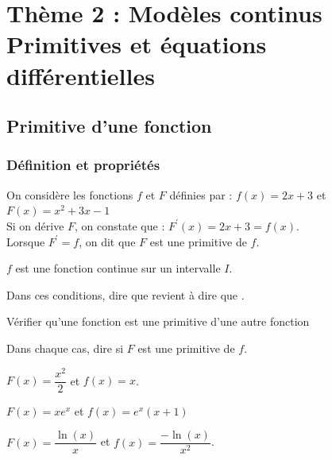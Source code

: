 \chapter[Thème 2 $-$ Primitives et équa diff]{Thème 2 : Modèles continus \\Primitives et équations différentielles}
\thispagestyle{fancy}

\vspace*{-0.6cm}
\section{Primitive d'une fonction}
\subsection{Définition et propriétés}

\begin{bexemple}
	On considère les fonctions $f$ et $F$ définies par : $f(x)=2 x+3$ et $F(x)=x^{2}+3 x-1$\\
	Si on dérive $F$, on constate que : $F^{\prime}(x)=2 x+3=f(x)$.\\
	Lorsque $F^{\prime}=f$, on dit que $F$ est une primitive de $f$.
\end{bexemple}

\begin{bdefi}
	$f$ est une fonction continue sur un intervalle $I$.\\
	\pointilles[\textwidth-0.5cm]
\end{bdefi}	

\begin{brmq}
	Dans ces conditions, dire que  revient à dire que  .
\end{brmq}

\begin{bmethodet}{Vérifier qu'une fonction est une primitive d'une autre fonction}
	
	Dans chaque cas, dire si $F$ est une primitive de $f$.
		\begin{enumMet}
		\item $F(x)=\dfrac{x^{2}}{2}$ et $f(x)=x$.
		\item $F(x)=x e^{x}$ et $f(x)=e^{x}(x+1)$
		\item $F(x)=\dfrac{\ln (x)}{x}$ et $f(x)=\dfrac{-\ln (x)}{x^{2}}$.
	\end{enumMet}
\end{bmethodet}

